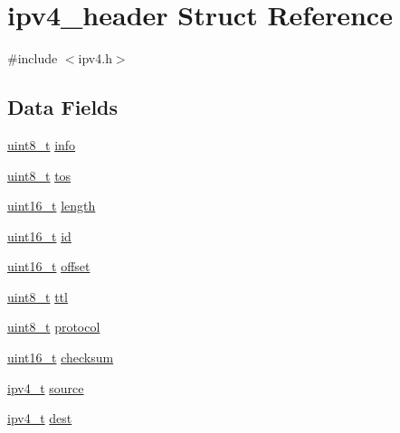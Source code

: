 \hypertarget{structipv4__header}{\section{ipv4\+\_\+header Struct Reference}
\label{structipv4__header}
}


{\ttfamily \#include $<$ipv4.\+h$>$}

\subsection*{Data Fields}
\begin{DoxyCompactItemize}
\item 
\hyperlink{aplus_8h_ae0430369c5a35dcdbc0bc19dcbb33a03}{uint8\+\_\+t} \hyperlink{structipv4__header_a40af269fc2efcdd3a4b85b550a376023}{info}
\item 
\hyperlink{aplus_8h_ae0430369c5a35dcdbc0bc19dcbb33a03}{uint8\+\_\+t} \hyperlink{structipv4__header_abd794754c36bf40eec3845d1b4a30715}{tos}
\item 
\hyperlink{aplus_8h_a5a8b2dc9e45a9ee81a94ef304fb62505}{uint16\+\_\+t} \hyperlink{structipv4__header_a369155b66b339effb565ee713000d695}{length}
\item 
\hyperlink{aplus_8h_a5a8b2dc9e45a9ee81a94ef304fb62505}{uint16\+\_\+t} \hyperlink{structipv4__header_a1b3ce4e0d6313af76d19bace542513a3}{id}
\item 
\hyperlink{aplus_8h_a5a8b2dc9e45a9ee81a94ef304fb62505}{uint16\+\_\+t} \hyperlink{structipv4__header_a6bae0493fa3323330e7c06c2d4ad0e4c}{offset}
\item 
\hyperlink{aplus_8h_ae0430369c5a35dcdbc0bc19dcbb33a03}{uint8\+\_\+t} \hyperlink{structipv4__header_a847be1c747cb3282ac66c766a176ecfd}{ttl}
\item 
\hyperlink{aplus_8h_ae0430369c5a35dcdbc0bc19dcbb33a03}{uint8\+\_\+t} \hyperlink{structipv4__header_ad08e98e98c2ccf2472f9740b68071979}{protocol}
\item 
\hyperlink{aplus_8h_a5a8b2dc9e45a9ee81a94ef304fb62505}{uint16\+\_\+t} \hyperlink{structipv4__header_ac6447b538451342a6f016aedd17eb9fa}{checksum}
\item 
\hyperlink{netif_8h_aea29db0d4ae23303ff7591af75c7b74a}{ipv4\+\_\+t} \hyperlink{structipv4__header_a87399a8dd7eb153478e63ce26450fe9c}{source}
\item 
\hyperlink{netif_8h_aea29db0d4ae23303ff7591af75c7b74a}{ipv4\+\_\+t} \hyperlink{structipv4__header_ad678f7696656cd04188dd3442294a793}{dest}
\end{DoxyCompactItemize}


